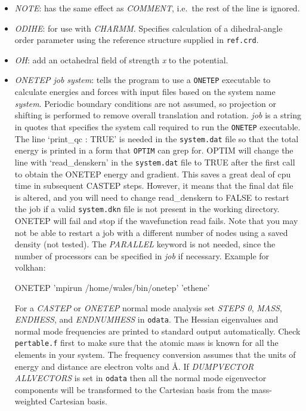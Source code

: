 \documentclass[12pt,a4paper,dvips]{article}
\begin{document}
\begin{itemize}
\item {\it NOTE\/}: has the same effect as {\it COMMENT\/}, i.e.~the rest of the line
is ignored.

\item {\it ODIHE\/}: for use with {\it CHARMM\/}. Specifies calculation of
a dihedral-angle order parameter using the reference structure supplied in {\tt ref.crd}.

\item {\it OH\/}: add an octahedral field of strength {\it x} to the potential.

\item {\it ONETEP job system\/}: tells the program to use a {\tt ONETEP} 
executable to calculate energies and
forces with input files based on the system name {\it system\/}. Periodic boundary 
conditions are not assumed, so projection or shifting is performed to remove overall translation and rotation.
{\it job} is a string in quotes that specifies the system call required to run 
the {\tt ONETEP} executable. 
The line `print\_qc : TRUE' is needed in the {\tt system.dat} file
so that the total energy is printed in a form that {\tt OPTIM} can grep for.
OPTIM will change the line with `read\_denskern' in the {\tt system.dat} file 
to TRUE after the first call to obtain the ONETEP energy and gradient.
This saves a great deal of cpu time in subsequent CASTEP steps.
However, it means that the final dat file is altered, and you will need
to change read\_denskern to FALSE to restart
the job if a valid {\tt system.dkn} file is not present in the working directory.
ONETEP will fail and stop if the wavefunction read fails.
Note that you may not be able to restart a job with a different number of nodes using
a saved density (not tested).
The {\it PARALLEL} keyword is not needed, since
the number of processors can be specified in {\it job} if necessary. Example for volkhan:

{\obeylines
ONETEP 'mpirun /home/wales/bin/onetep' 'ethene'
}

For a {\it CASTEP\/} or {\it ONETEP} normal mode analysis set
{\it STEPS 0\/}, {\it MASS\/}, {\it ENDHESS\/}, and {\it ENDNUMHESS\/} in {\tt odata}.
The Hessian eigenvalues and normal mode frequencies are printed to standard output automatically.
Check {\tt pertable.f} first to make sure that the atomic mass is known for all the
elements in your system. The frequency conversion assumes that the units of energy and
distance are electron volts and \AA.
If {\it DUMPVECTOR ALLVECTORS\/} is set in {\tt odata} then all
the normal mode eigenvector components will be transformed to the Cartesian basis from the
mass-weighted Cartesian basis.



\end{itemize}
\end{document}
